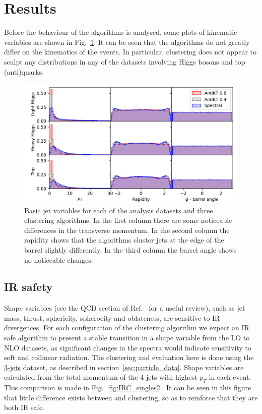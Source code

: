 \section{Results}

Before the behaviour of the algorithms is analysed, some plots of kinematic variables are shown
in Fig.~\ref{fig:kinematics}.
It can be seen that the algorithms do not greatly differ on the kinematics of the events.
In particular, \spectral{} clustering does not appear to sculpt any distributions in any of the datasets involving Higgs bosons and top (anti)quarks.


\begin{figure}[htp]
    \begin{center}
    \includegraphics[width=\textwidth]{graphics/kinematics}
        \caption{Basic jet variables for each of the analysis datasets and three clustering algorithms.
            In the first column there are some noticeable differences in the transverse momentum.
            In the second column the rapidity shows that
            the algorithms cluster jets at the edge of the barrel slightly differently.
            In the third column the barrel angle shows no noticeable changes.
        }\label{fig:kinematics}
\end{center}
\end{figure}

\subsection{IR safety}
Shape variables (see the QCD section of Ref.~\cite{Altarelli:1989hv} for a useful review), such as jet mass, thrust, sphericity, spherocity and oblateness,  are sensitive to IR divergences.
For each configuration of the clustering algorithm we expect an IR safe algorithm to present a stable transition
in a shape variable from the LO to NLO datasets, as significant
changes in the spectra would indicate sensitivity to soft and collinear radiation.
The clustering and evaluation here is done using the \underline{3-jets} dataset, as described in section~\ref{sec:particle_data}.
Shape variables are calculated from the total momentum of the 4 jets with highest \(p_T\) in each event.
This comparison is made in Fig.~\ref{fig:IRC_singles2}.
It can be seen in this figure that little difference exists between \genkt{} and \spectral{} clustering, so as to reinforce that they are both IR safe.

